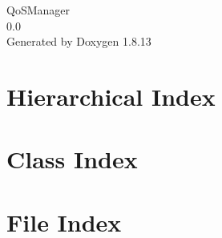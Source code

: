 \documentclass[twoside]{book}
\newcommand{\+}{\discretionary{\mbox{\scriptsize$\hookleftarrow$}}{}{}}
\newcommand{\clearemptydoublepage}{%
  \newpage{\pagestyle{empty}\cleardoublepage}%
}
\begin{document}
\hypersetup{pageanchor=false,
             bookmarksnumbered=true,
             pdfencoding=unicode
            }
\begin{titlepage}
\vspace*{7cm}
\begin{center}%
{\Large Qo\+S\+Manager \\[1ex]\large 0.\+0 }\\
\vspace*{1cm}
{\large Generated by Doxygen 1.8.13}\\
\end{center}
\end{titlepage}
\clearemptydoublepage
{}
\tableofcontents
\clearemptydoublepage
{}
\hypersetup{pageanchor=true}

\chapter{Hierarchical Index}

\chapter{Class Index}

\chapter{File Index}

\end{document}
